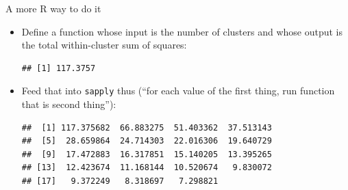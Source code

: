 \begin{frame}[fragile]{A more R way to do it}
  
  \begin{itemize}
  \item Define a function whose input is the number of clusters and
    whose output is the total within-cluster sum of squares:
    
\begin{knitrout}
\color{fgcolor}\begin{kframe}
\begin{alltt}
\hlkwb{=}\hlstd{(}\hlstd{) \{}
  \hlstd{(vital.s[}\hlopt{:}\hlstd{],nclust,}\hlstd{=}\hlstd{)}\hlopt{$}
\hlstd{\}}
\hlstd{(}\hlstd{)}
\end{alltt}
\begin{verbatim}
## [1] 117.3757
\end{verbatim}
\end{kframe}
\end{knitrout}

\item Feed that into \texttt{sapply} thus (``for each value of the
  first thing, run function that is second thing''):
  
\begin{knitrout}\small
{}\color{fgcolor}\begin{kframe}
\begin{alltt}
\hlkwb{=}
\end{alltt}
\begin{verbatim}
##  [1] 117.375682  66.883275  51.403362  37.513143
##  [5]  28.659864  24.714303  22.016306  19.640729
##  [9]  17.472883  16.317851  15.140205  13.395265
## [13]  12.423674  11.168144  10.520674   9.830072
## [17]   9.372249   8.318697   7.298821
\end{verbatim}
\end{kframe}
\end{knitrout}

  \end{itemize}
  
\end{frame}

